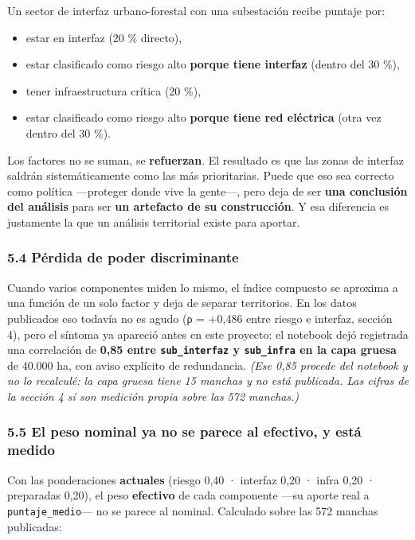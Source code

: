 \documentclass[
  spanish,
  10pt,
]{article}
\providecommand{\tightlist}{%
  \setlength{\itemsep}{0pt}\setlength{\parskip}{0pt}}
\begin{document}
Un sector de interfaz urbano-forestal con una subestación recibe puntaje
por:

\begin{itemize}
\tightlist
\item
  estar en interfaz (20 \% directo),
\item
  estar clasificado como riesgo alto \textbf{porque tiene interfaz}
  (dentro del 30 \%),
\item
  tener infraestructura crítica (20 \%),
\item
  estar clasificado como riesgo alto \textbf{porque tiene red eléctrica}
  (otra vez dentro del 30 \%).
\end{itemize}

Los factores no se suman, se \textbf{refuerzan}. El resultado es que las
zonas de interfaz saldrán sistemáticamente como las más prioritarias.
Puede que eso sea correcto como política ---proteger donde vive la
gente---, pero deja de ser \textbf{una conclusión del análisis} para ser
\textbf{un artefacto de su construcción}. Y esa diferencia es justamente
la que un análisis territorial existe para aportar.

\subsubsection{5.4 Pérdida de poder
discriminante}\label{puxe9rdida-de-poder-discriminante}

Cuando varios componentes miden lo mismo, el índice compuesto se
aproxima a una función de un solo factor y deja de separar territorios.
En los datos publicados eso todavía no es agudo (ρ = +0,486 entre riesgo
e interfaz, sección 4), pero el síntoma ya apareció antes en este
proyecto: el notebook dejó registrada una correlación de \textbf{0,85
entre \texttt{sub\_interfaz} y \texttt{sub\_infra} en la capa gruesa} de
40.000 ha, con aviso explícito de redundancia. \emph{(Ese 0,85 procede
del notebook y no lo recalculé: la capa gruesa tiene 15 manchas y no
está publicada. Las cifras de la sección 4 sí son medición propia sobre
las 572 manchas.)}

\subsubsection{5.5 El peso nominal ya no se parece al efectivo, y está
medido}\label{el-peso-nominal-ya-no-se-parece-al-efectivo-y-estuxe1-medido}

Con las ponderaciones \textbf{actuales} (riesgo 0,40 · interfaz 0,20 ·
infra 0,20 · preparadas 0,20), el peso \textbf{efectivo} de cada
componente ---su aporte real a \texttt{puntaje\_medio}--- no se parece
al nominal. Calculado sobre las 572 manchas publicadas:
\end{document}
